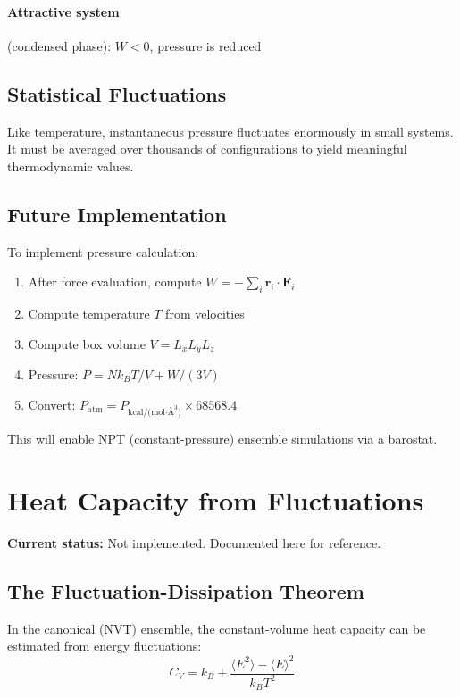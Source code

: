 \documentclass[11pt]{article}
\begin{document}
\paragraph{Attractive system} (condensed phase): $W < 0$, pressure is reduced

\subsection{Statistical Fluctuations}

Like temperature, instantaneous pressure fluctuates enormously in small systems. It must be averaged over thousands of configurations to yield meaningful thermodynamic values.

\subsection{Future Implementation}

To implement pressure calculation:
\begin{enumerate}
\item After force evaluation, compute $W = -\sum_i \mathbf{r}_i \cdot \mathbf{F}_i$
\item Compute temperature $T$ from velocities
\item Compute box volume $V = L_x L_y L_z$
\item Pressure: $P = N k_B T / V + W / (3V)$
\item Convert: $P_{\text{atm}} = P_{\text{kcal/(mol·\AA}^3\text{)}} \times 68568.4$
\end{enumerate}

This will enable NPT (constant-pressure) ensemble simulations via a barostat.

\section{Heat Capacity from Fluctuations}

\textbf{Current status:} Not implemented. Documented here for reference.

\subsection{The Fluctuation-Dissipation Theorem}

In the canonical (NVT) ensemble, the constant-volume heat capacity can be estimated from energy fluctuations:
\begin{equation}
C_V = k_B + \frac{\langle E^2 \rangle - \langle E \rangle^2}{k_B T^2}
\end{equation}
\end{document}
